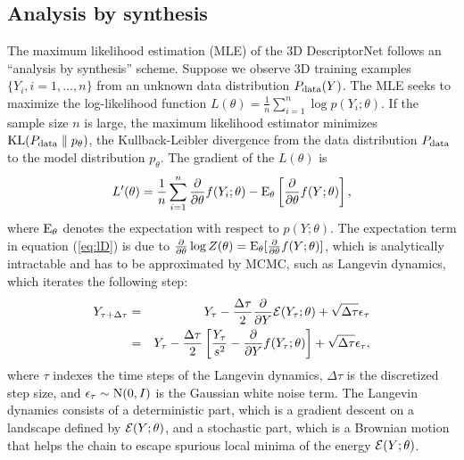 \documentclass[10pt,twocolumn,letterpaper]{article}
\def\E{{\rm E}}
\def\N{{\rm N}}
\def\KL{{\rm KL}}
\def\P{P_{\rm data}}
\begin{document}
 \subsection{Analysis by synthesis} 
 The maximum likelihood estimation (MLE) of the 3D DescriptorNet follows an ``analysis by synthesis'' scheme. Suppose we observe 3D training examples $\{Y_i, i = 1, ..., n\}$ from an unknown data distribution $\P(Y)$. The MLE seeks to maximize the log-likelihood function 
$   L(\theta) = \frac{1}{n} \sum_{i=1}^{n} \log p(Y_i; \theta). 
$ 
If the sample size $n$ is large, the maximum likelihood estimator minimizes $\KL(\P \parallel p_\theta)$, the Kullback-Leibler divergence from the data distribution $\P$ to the model distribution $p_\theta$. 
The gradient of the $L(\theta)$ is 
  \begin{eqnarray} 
  L'(\theta) = \frac{1}{n} \sum_{i=1}^{n} \frac{\partial}{\partial \theta} f(Y_i; \theta) - \E_{\theta} \left[\frac{\partial}{\partial \theta} f(Y; \theta)\right],  \label{eq:lD}
\end{eqnarray} 
where  $\E_{\theta}$ denotes the expectation with respect to $p(Y; \theta)$. The expectation term in equation (\ref{eq:lD}) is due to
$\frac{\partial}{\partial \theta}  \log Z(\theta) = \E_{\theta}[\frac{\partial}{\partial \theta}  f(Y; \theta)]$, which is analytically intractable and has to be approximated by MCMC, such as Langevin  dynamics,  which iterates the following step: 
\begin{eqnarray}
   Y_{\tau+\Delta \tau} &=& Y_\tau - \frac{\Delta \tau}{2} \frac{\partial}{\partial Y}  {\cal E}(Y_\tau; \theta) + \sqrt{\Delta \tau}\epsilon_{\tau} \nonumber\\ 
   &=& Y_\tau - \frac{\Delta \tau}{2} \left[ \frac{Y_\tau}{s^2} - \frac{\partial}{\partial Y} f(Y_\tau; \theta) \right] + \sqrt{ \Delta \tau}\epsilon_{\tau},
    \label{eq:LangevinD}
\end{eqnarray}
where $\tau$ indexes the time steps of the Langevin dynamics, $\Delta \tau$ is the discretized step size, and $\epsilon_{\tau} \sim \N(0, I)$ is the Gaussian white noise term.  The Langevin dynamics consists of a  deterministic part, which is a gradient descent on a landscape defined by ${\cal E}(Y; \theta)$, and a stochastic part, which is a Brownian motion that helps  the chain to escape spurious local minima of the energy ${\cal E}(Y; \theta)$. 
\end{document}
